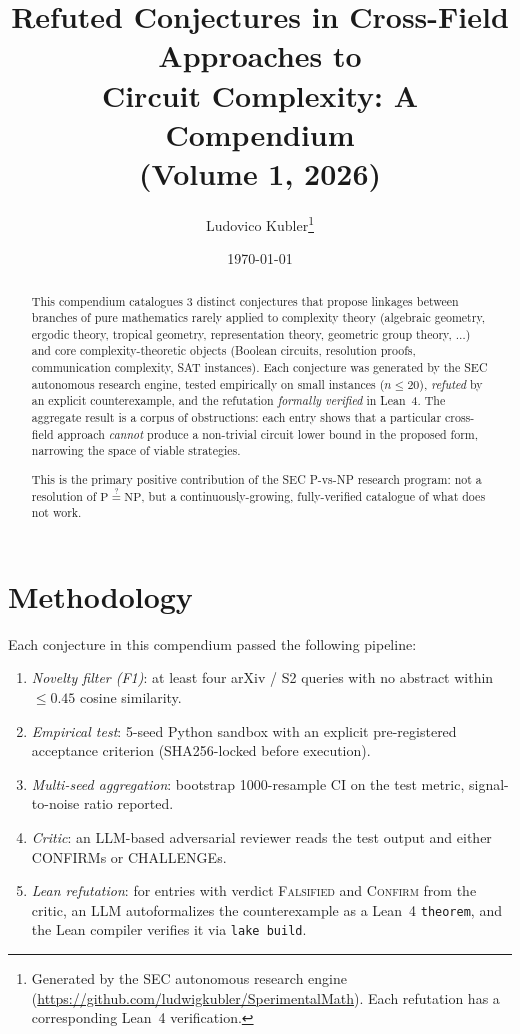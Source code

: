\documentclass[11pt,a4paper]{article}
\title{Refuted Conjectures in Cross-Field Approaches to\\
Circuit Complexity: A Compendium\\[1ex]
\large(Volume 1, 2026)}
\author{Ludovico Kubler\thanks{Generated by the SEC autonomous research engine
(\url{https://github.com/ludwigkubler/SperimentalMath}).
Each refutation has a corresponding Lean~4 verification.}}
\date{\today}
\begin{document}
\maketitle

\begin{abstract}
This compendium catalogues 3 distinct conjectures that propose linkages
between branches of pure mathematics rarely applied to complexity theory
(algebraic geometry, ergodic theory, tropical geometry, representation
theory, geometric group theory, $\dots$) and core complexity-theoretic
objects (Boolean circuits, resolution proofs, communication complexity,
SAT instances). Each conjecture was generated by the SEC autonomous
research engine, tested empirically on small instances ($n\le 20$),
\emph{refuted} by an explicit counterexample, and the refutation
\emph{formally verified} in Lean~4. The aggregate result is a corpus of
obstructions: each entry shows that a particular cross-field approach
\emph{cannot} produce a non-trivial circuit lower bound in the proposed
form, narrowing the space of viable strategies.

This is the primary positive contribution of the SEC P-vs-NP research
program: not a resolution of $\mathrm{P}\stackrel{?}{=}\mathrm{NP}$, but
a continuously-growing, fully-verified catalogue of what does not work.
\end{abstract}


\section{Methodology}
Each conjecture in this compendium passed the following pipeline:

\begin{enumerate}
  \item \emph{Novelty filter (F1)}: at least four arXiv / S2 queries with
    no abstract within $\le 0.45$ cosine similarity.
  \item \emph{Empirical test}: 5-seed Python sandbox with an explicit
    pre-registered acceptance criterion (SHA256-locked before execution).
  \item \emph{Multi-seed aggregation}: bootstrap 1000-resample CI on the
    test metric, signal-to-noise ratio reported.
  \item \emph{Critic}: an LLM-based adversarial reviewer reads the test
    output and either CONFIRMs or CHALLENGEs.
  \item \emph{Lean refutation}: for entries with verdict
    \textsc{Falsified} and \textsc{Confirm} from the critic, an LLM
    autoformalizes the counterexample as a Lean~4 \texttt{theorem}, and
    the Lean compiler verifies it via \texttt{lake build}.
\end{enumerate}
\end{document}
